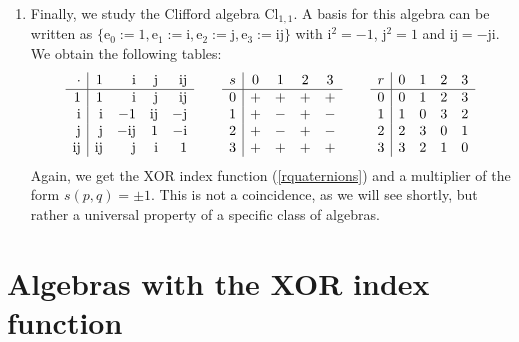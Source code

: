 \documentclass{article}
\begin{document}
\begin{enumerate}
\item Finally, we study the Clifford algebra $\mathrm{Cl}_{1,1}$. A basis for this algebra can be written as $\{ \mathrm e_0 :=  1, \mathrm e_1 := \mathrm i, \mathrm e_2 := \mathrm j, \mathrm e_3 := {\mathrm i\mathrm j} \}$ with $\mathrm i^2 = -1$, $\mathrm j^2 = 1$ and ${\mathrm i\mathrm j} = - {\mathrm j\mathrm i}$. We obtain the following tables:
$$ \begin{array}{r | r r r r}
   \cdot & 1 & \mathrm i & \mathrm j & {\mathrm i\mathrm j} \\
     \hline
     1 & 1 & \mathrm i & \mathrm j & {\mathrm i\mathrm j} \\
     \mathrm i & \mathrm i & -1 & {\mathrm i\mathrm j} & -\mathrm j \\
     \mathrm j & \mathrm j & -{\mathrm i\mathrm j} & 1 & -\mathrm i \\
     {\mathrm i\mathrm j} & {\mathrm i\mathrm j} & \mathrm j & \mathrm i & 1 \\
\end{array} \qquad \begin{array}{c | c c c c}
     s & 0 & 1 & 2 & 3 \\
     \hline
     0 & + & + & + & + \\
     1 & + & - & + & - \\
     2 & + & - & + & - \\
     3 & + & + & + & + \\
\end{array} \qquad
\begin{array}{c | c c c c}
     r & 0 & 1 & 2 & 3 \\
     \hline
     0 & 0 & 1 & 2 & 3 \\
     1 & 1 & 0 & 3 & 2 \\
     2 & 2 & 3 & 0 & 1 \\
     3 & 3 & 2 & 1 & 0 \\
\end{array} $$
Again, we get the XOR index function (\ref{rquaternions}) and a multiplier of the form $s(p,q) = \pm 1$. This is not a coincidence, as we will see shortly, but rather a universal property of a specific class of algebras.
\end{enumerate}

\sloppy\section{Algebras with the XOR index function}
\label{section : Commutation property and XOR index function}
\end{document}
